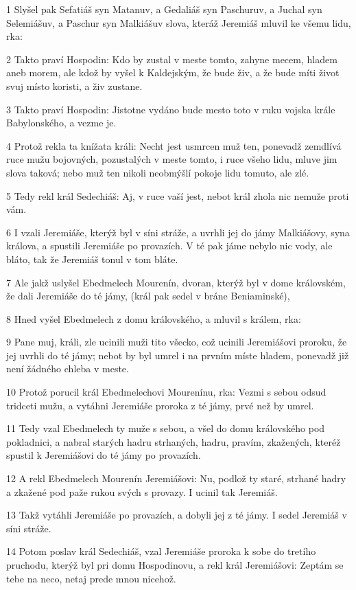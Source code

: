 \par 1 Slyšel pak Sefatiáš syn Matanuv, a Gedaliáš syn Paschuruv, a Juchal syn Selemiášuv, a Paschur syn Malkiášuv slova, kteráž Jeremiáš mluvil ke všemu lidu, rka:
\par 2 Takto praví Hospodin: Kdo by zustal v meste tomto, zahyne mecem, hladem aneb morem, ale kdož by vyšel k Kaldejským, že bude živ, a že bude míti život svuj místo koristi, a živ zustane.
\par 3 Takto praví Hospodin: Jistotne vydáno bude mesto toto v ruku vojska krále Babylonského, a vezme je.
\par 4 Protož rekla ta knížata králi: Necht jest usmrcen muž ten, ponevadž zemdlívá ruce mužu bojovných, pozustalých v meste tomto, i ruce všeho lidu, mluve jim slova taková; nebo muž ten nikoli neobmýšlí pokoje lidu tomuto, ale zlé.
\par 5 Tedy rekl král Sedechiáš: Aj, v ruce vaší jest, nebot král zhola nic nemuže proti vám.
\par 6 I vzali Jeremiáše, kterýž byl v síni stráže, a uvrhli jej do jámy Malkiášovy, syna králova, a spustili Jeremiáše po provazích. V té pak jáme nebylo nic vody, ale bláto, tak že Jeremiáš tonul v tom bláte.
\par 7 Ale jakž uslyšel Ebedmelech Mourenín, dvoran, kterýž byl v dome královském, že dali Jeremiáše do té jámy, (král pak sedel v bráne Beniaminské),
\par 8 Hned vyšel Ebedmelech z domu královského, a mluvil s králem, rka:
\par 9 Pane muj, králi, zle ucinili muži tito všecko, což ucinili Jeremiášovi proroku, že jej uvrhli do té jámy; nebot by byl umrel i na prvním míste hladem, ponevadž již není žádného chleba v meste.
\par 10 Protož porucil král Ebedmelechovi Mourenínu, rka: Vezmi s sebou odsud tridceti mužu, a vytáhni Jeremiáše proroka z té jámy, prvé než by umrel.
\par 11 Tedy vzal Ebedmelech ty muže s sebou, a všel do domu královského pod pokladnici, a nabral starých hadru strhaných, hadru, pravím, zkažených, kteréž spustil k Jeremiášovi do té jámy po provazích.
\par 12 A rekl Ebedmelech Mourenín Jeremiášovi: Nu, podlož ty staré, strhané hadry a zkažené pod paže rukou svých s provazy. I ucinil tak Jeremiáš.
\par 13 Takž vytáhli Jeremiáše po provazích, a dobyli jej z té jámy. I sedel Jeremiáš v síni stráže.
\par 14 Potom poslav král Sedechiáš, vzal Jeremiáše proroka k sobe do tretího pruchodu, kterýž byl pri domu Hospodinovu, a rekl král Jeremiášovi: Zeptám se tebe na neco, netaj prede mnou nicehož.
